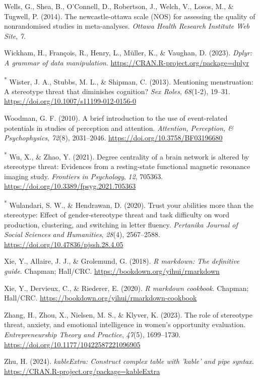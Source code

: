 \documentclass[
  stu, a4paper, 12pt,mask,floatsintext]{apa7}
\newlength{\cslhangindent}
\newenvironment{CSLReferences}[2] %
 {\begin{list}{}{%
  \setlength{\itemindent}{0pt}
  \setlength{\leftmargin}{0pt}
  \setlength{\parsep}{0pt}
  \ifodd #1
   \setlength{\leftmargin}{\cslhangindent}
   \setlength{\itemindent}{-1\cslhangindent}
  \fi
  \setlength{\itemsep}{#2\baselineskip}}}
 {\end{list}}
\begin{document}
\begin{CSLReferences}{1}{0}
Wells, G., Shea, B., O'Connell, D., Robertson, J., Welch, V., Losos, M., \& Tugwell, P. (2014). The newcastle-ottawa scale ({NOS}) for assessing the quality of nonrandomised studies in meta-analyses. \emph{Ottawa Health Research Institute Web Site}, \emph{7}.

Wickham, H., François, R., Henry, L., Müller, K., \& Vaughan, D. (2023). \emph{Dplyr: A grammar of data manipulation}. \url{https://CRAN.R-project.org/package=dplyr}

\textsuperscript{*} Wister, J. A., Stubbs, M. L., \& Shipman, C. (2013). Mentioning menstruation: A stereotype threat that diminishes cognition? \emph{Sex Roles}, \emph{68}(1-2), 19--31. \url{https://doi.org/10.1007/s11199-012-0156-0}

Woodman, G. F. (2010). A brief introduction to the use of event-related potentials in studies of perception and attention. \emph{Attention, Perception, \& Psychophysics}, \emph{72}(8), 2031--2046. \url{https://doi.org/10.3758/BF03196680}

\textsuperscript{*} Wu, X., \& Zhao, Y. (2021). Degree centrality of a brain network is altered by stereotype threat: {Evidences} from a resting-state functional magnetic resonance imaging study. \emph{Frontiers in Psychology}, \emph{12}, 705363. \url{https://doi.org/10.3389/fpsyg.2021.705363}

\textsuperscript{*} Wulandari, S. W., \& Hendrawan, D. (2020). Trust your abilities more than the stereotype: {Effect} of gender-stereotype threat and task difficulty on word production, clustering, and switching in letter fluency. \emph{Pertanika Journal of Social Sciences and Humanities}, \emph{28}(4), 2567--2588. \url{https://doi.org/10.47836/pjssh.28.4.05}

Xie, Y., Allaire, J. J., \& Grolemund, G. (2018). \emph{R markdown: The definitive guide}. Chapman; Hall/CRC. \url{https://bookdown.org/yihui/rmarkdown}

Xie, Y., Dervieux, C., \& Riederer, E. (2020). \emph{R markdown cookbook}. Chapman; Hall/CRC. \url{https://bookdown.org/yihui/rmarkdown-cookbook}

Zhang, H., Zhou, X., Nielsen, M. S., \& Klyver, K. (2023). The role of stereotype threat, anxiety, and emotional intelligence in women's opportunity evaluation. \emph{Entrepreneurship Theory and Practice}, \emph{47}(5), 1699--1730. \url{https://doi.org/10.1177/10422587221096905}

Zhu, H. (2024). \emph{kableExtra: Construct complex table with 'kable' and pipe syntax}. \url{https://CRAN.R-project.org/package=kableExtra}

\end{CSLReferences}
\end{document}

